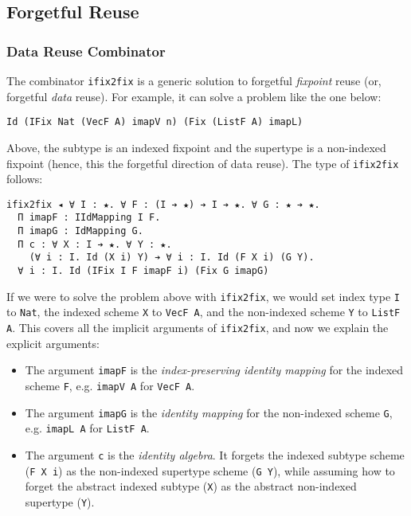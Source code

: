 \documentclass[acmsmall]{acmart}\settopmatter{}
\newcommand{\labsec}[1]{\label{sec:#1}}
\begin{document}
\subsection{Forgetful Reuse}
\labsec{data:fog}

\subsubsection{Data Reuse Combinator}

The combinator \verb;ifix2fix; is a generic solution to forgetful
\textit{fixpoint} reuse (or, forgetful \textit{data} reuse). For
example, it can solve a problem like the one below:
\begin{verbatim}
Id (IFix Nat (VecF A) imapV n) (Fix (ListF A) imapL)
\end{verbatim}
Above, the subtype is an indexed fixpoint and the supertype is a
non-indexed fixpoint (hence, this the forgetful direction of data
reuse). The type of \verb;ifix2fix; follows:
\begin{verbatim}
ifix2fix ◂ ∀ I : ★. ∀ F : (I ➔ ★) ➔ I ➔ ★. ∀ G : ★ ➔ ★. 
  Π imapF : IIdMapping I F. 
  Π imapG : IdMapping G.
  Π c : ∀ X : I ➔ ★. ∀ Y : ★. 
    (∀ i : I. Id (X i) Y) ➔ ∀ i : I. Id (F X i) (G Y).
  ∀ i : I. Id (IFix I F imapF i) (Fix G imapG)
\end{verbatim}
If we were to solve the problem above with \verb;ifix2fix;,
we would set index type \verb;I; to \verb;Nat;,
the indexed scheme \verb;X; to
\verb;VecF A;, and the non-indexed scheme \verb;Y; to \verb;ListF A;.
This covers all the implicit arguments of \verb;ifix2fix;,
and now we explain the explicit arguments:

\begin{itemize}
\item The argument \verb;imapF;  is the
  \textit{index-preserving identity mapping} for the indexed scheme \verb;F;,
  e.g. \verb;imapV A; for \verb;VecF A;.

\item The argument \verb;imapG; is the
  \textit{identity mapping} for the non-indexed scheme \verb;G;,
  e.g. \verb;imapL A; for \verb;ListF A;.

\item The argument \verb;c; is the \textit{identity algebra}. It
  forgets the indexed subtype scheme (\verb;F X i;) as
  the non-indexed supertype scheme (\verb;G Y;), while assuming
  how to forget the abstract indexed subtype (\verb;X;) as the
  abstract non-indexed supertype (\verb;Y;).
\end{itemize}
\end{document}
